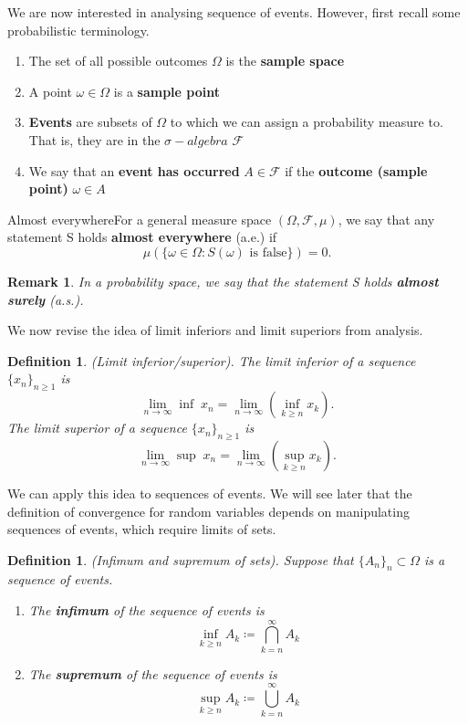 \documentclass[twoside]{article}
\newtheorem{definition}[theorem]{Definition}
\newtheorem{remark}[theorem]{Remark}
\newcommand{\sigmalgebra}{\mathcal{F}}
\newcommand{\sa}{\sigma-algebra}
\begin{document}
We are now interested in analysing sequence of events. However, first recall some probabilistic terminology.
\begin{enumerate}
\item The set of all possible outcomes $\Omega$ is the \textbf{sample space}
\item A point $\omega \in \Omega$ is a \textbf{sample point}
\item \textbf{Events} are subsets of $\Omega$ to which we can assign a probability measure to. That is, they are in the $\sa$ $\sigmalgebra$
\item We say that an \textbf{event has occurred} $A \in \sigmalgebra$ if the \textbf{outcome (sample point)} $\omega \in A$
\end{enumerate}

\begin{definition_exam}{Almost everywhere}{}For a general measure space $(\Omega, \sigmalgebra, \mu)$, we say that any statement S holds \textbf{almost everywhere} (a.e.) if 
$$
\mu(\{\omega \in \Omega: S(\omega) \text{ is false}\}) = 0.
$$
\end{definition_exam}

\begin{remark} In a probability space, we say that the statement S holds \textbf{almost surely} (a.s.).
\end{remark}

We now revise the idea of limit inferiors and limit superiors from analysis.

\begin{definition}(Limit inferior/superior). The limit inferior of a sequence $\{x_n\}_{n \geq 1}$ is 
$$
\lim_{n \rightarrow \infty}\inf\;x_n = \lim_{n \rightarrow \infty}(\inf_{k \geq n}x_k).
$$
The limit superior of a sequence $\{x_n\}_{n \geq 1}$ is 
$$
\lim_{n \rightarrow \infty}\sup\;x_n = \lim_{n \rightarrow \infty}(\sup_{k \geq n}x_k).
$$
\end{definition}

We can apply this idea to sequences of events. We will see later that the definition of convergence for random variables depends on manipulating sequences of events, which require limits of sets. 
\begin{definition}(Infimum and supremum of sets). Suppose that $\{A_n\}_n \subset \Omega$ is a sequence of events. 
\begin{enumerate}
\item The \textbf{infimum} of the sequence of events is 
$$
\inf_{k \geq n}A_k \coloneqq \bigcap_{k=n}^{\infty}A_k
$$
\item The \textbf{supremum} of the sequence of events is 
$$
\sup_{k \geq n}A_k \coloneqq \bigcup_{k=n}^{\infty}A_k
$$
\end{enumerate}
\end{definition}
\end{document}
